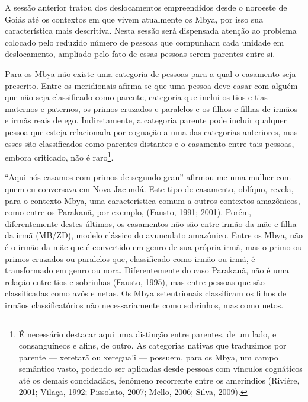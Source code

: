 \documentclass{article}
\begin{document}
A sess\~ao anterior tratou dos deslocamentos empreendidos desde o
noroeste de Goi\'as at\'e os contextos em que vivem atualmente os Mbya,
por isso sua caracter\'istica mais descritiva. Nesta sess\~ao ser\'a
dispensada aten\c{c}\~ao ao problema colocado pelo reduzido n\'umero de
pessoas que compunham cada unidade em deslocamento, ampliado pelo fato
de essas pessoas serem parentes entre si.

Para os Mbya n\~ao existe uma categoria de pessoas para a qual o
casamento seja prescrito. Entre os meridionais afirma-se que uma pessoa
deve casar com algu\'em que n\~ao seja classificado como parente,
categoria que inclui os tios e tias maternos e paternos, os primos
cruzados e paralelos e os filhos e filhas de irm\~aos e irm\~as reais
de ego. Indiretamente, a categoria parente pode incluir qualquer pessoa
que esteja relacionada por cogna\c{c}\~ao a uma das categorias
anteriores, mas esses s\~ao classificados como parentes distantes e o
casamento entre tais pessoas, embora criticado, n\~ao \'e
raro\footnote{ \'E necess\'ario destacar aqui uma distin\c{c}\~ao entre
parentes, de um lado, e consangu\'ineos e afins, de outro. As
categorias nativas que traduzimos por parente --- xeretar\~a ou
xeregua{\textquoteright}i --- possuem, para os Mbya, um campo
sem\^antico vasto, podendo ser aplicadas desde pessoas com v\'inculos
cogn\'aticos at\'e os demais concidad\~aos, fen\^omeno recorrente entre
os amer\'indios (Rivi\'ere, 2001; Vila\c{c}a, 1992; Pissolato, 2007;
Mello, 2006; Silva, 2009).}. 

{\textquotedblleft}Aqui n\'os casamos com primos de segundo
grau{\textquotedblright} afirmou-me uma mulher com quem eu conversava
em Nova Jacund\'a. Este tipo de casamento, obl\'iquo, revela, para o
contexto Mbya, uma caracter\'istica comum a outros contextos
amaz\^onicos, como entre os Parakan\~a, por exemplo, (Fausto, 1991;
2001). Por\'em, diferentemente destes \'ultimos, os casamentos n\~ao
s\~ao entre irm\~ao da m\~ae e filha da irm\~a (MB/ZD), modelo
cl\'assico do avunculato amaz\^onico. Entre os Mbya, n\~ao \'e o
irm\~ao da m\~ae que \'e convertido em genro de sua pr\'opria irm\~a,
mas o primo ou primos cruzados ou paralelos que, classificado como
irm\~ao ou irm\~a, \'e transformado em genro ou nora. Diferentemente do
caso Parakan\~a, n\~ao \'e uma rela\c{c}\~ao entre tios e sobrinhas
(Fausto, 1995), mas entre pessoas que s\~ao classificadas como av\^os e
netas. Os Mbya setentrionais classificam os filhos de irm\~aos
classificat\'orios n\~ao necessariamente como sobrinhos, mas como
netos.
\end{document}
